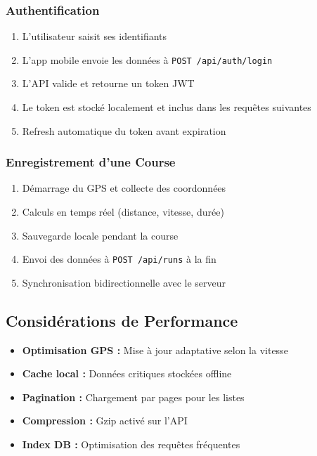 \subsubsection{Authentification}

\begin{enumerate}
    \item L'utilisateur saisit ses identifiants
    \item L'app mobile envoie les données à \texttt{POST /api/auth/login}
    \item L'API valide et retourne un token JWT
    \item Le token est stocké localement et inclus dans les requêtes suivantes
    \item Refresh automatique du token avant expiration
\end{enumerate}

\subsubsection{Enregistrement d'une Course}

\begin{enumerate}
    \item Démarrage du GPS et collecte des coordonnées
    \item Calculs en temps réel (distance, vitesse, durée)
    \item Sauvegarde locale pendant la course
    \item Envoi des données à \texttt{POST /api/runs} à la fin
    \item Synchronisation bidirectionnelle avec le serveur
\end{enumerate}

\subsection{Considérations de Performance}

\begin{itemize}
    \item \textbf{Optimisation GPS :} Mise à jour adaptative selon la vitesse
    \item \textbf{Cache local :} Données critiques stockées offline
    \item \textbf{Pagination :} Chargement par pages pour les listes
    \item \textbf{Compression :} Gzip activé sur l'API
    \item \textbf{Index DB :} Optimisation des requêtes fréquentes
\end{itemize}

